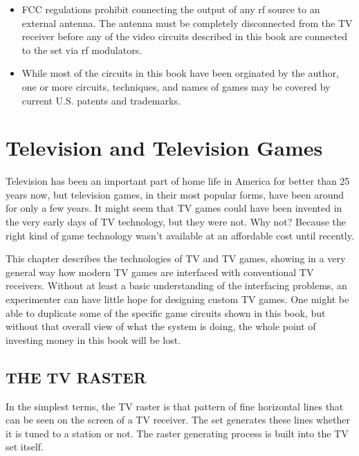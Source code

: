 \documentclass[11pt]{book}              %
\begin{document}
\begin{itemize}
  \item FCC regulations prohibit connecting the output of any rf source to an external antenna. The antenna must be completely disconnected from the TV receiver before any of the video circuits described in this book are connected to the set via rf modulators.
  \item While most of the circuits in this book have been orginated by the author, one or more circuits, techniques, and names of games may be covered by current U.S. patents and trademarks.
\end{itemize}

\tableofcontents                        %
\mainmatter                             %

\chapter{Television and Television Games}

Television has been an important part of home life in America for better than 25 years now, but television games, in their most popular
forms, have been around for only a few years. It might seem that TV games could have been invented in the very early days of TV technology, but they were not. Why not? Because the right kind of game technology wasn't available at an affordable cost until recently.

This chapter describes the technologies of TV and TV games, showing in a very general way how modern TV games are interfaced with conventional TV receivers. Without at least a basic understanding of the interfacing problems, an experimenter can have little hope for designing custom TV games. One might be able to duplicate some of the specific game circuits shown in this book, but without that overall view of what the system is doing, the whole point of investing money in this book will be lost.

\section{THE TV RASTER}

In the simplest terms, the TV raster is that pattern of fine horizontal lines that can be seen on the screen of a TV receiver. The set generates these lines whether it is tuned to a station or not. The raster generating process is built into the TV set itself.
\end{document}
